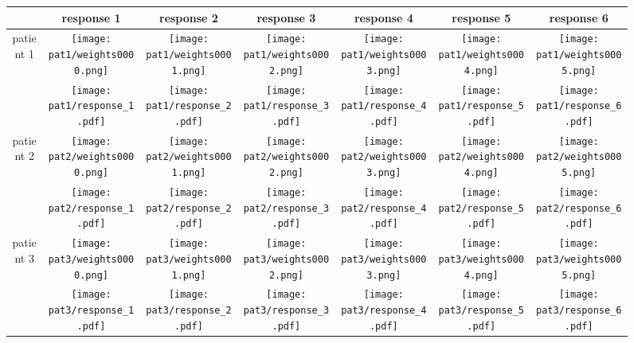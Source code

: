 \documentclass{article}
\begin{document}
\begin{figure}[htbp]
\begin{tabular}{*{7}{c}}
\toprule
& response 1 & response 2 & response 3 & response 4 & response 5 & response 6 \\
\midrule

\multirow{2}{*}{patient 1} & 
\texttt{[image: pat1/weights0000.png]} &
\texttt{[image: pat1/weights0001.png]} &
\texttt{[image: pat1/weights0002.png]} &
\texttt{[image: pat1/weights0003.png]} &
\texttt{[image: pat1/weights0004.png]} &
\texttt{[image: pat1/weights0005.png]} \\
& 
\texttt{[image: pat1/response\_1.pdf]} &
\texttt{[image: pat1/response\_2.pdf]} &
\texttt{[image: pat1/response\_3.pdf]} &
\texttt{[image: pat1/response\_4.pdf]} &
\texttt{[image: pat1/response\_5.pdf]} &
\texttt{[image: pat1/response\_6.pdf]} \\


\multirow{2}{*}{patient 2} & 
\texttt{[image: pat2/weights0000.png]} &
\texttt{[image: pat2/weights0001.png]} &
\texttt{[image: pat2/weights0002.png]} &
\texttt{[image: pat2/weights0003.png]} &
\texttt{[image: pat2/weights0004.png]} &
\texttt{[image: pat2/weights0005.png]} \\
& 
\texttt{[image: pat2/response\_1.pdf]} &
\texttt{[image: pat2/response\_2.pdf]} &
\texttt{[image: pat2/response\_3.pdf]} &
\texttt{[image: pat2/response\_4.pdf]} &
\texttt{[image: pat2/response\_5.pdf]} &
\texttt{[image: pat2/response\_6.pdf]} \\


\multirow{2}{*}{patient 3} & 
\texttt{[image: pat3/weights0000.png]} &
\texttt{[image: pat3/weights0001.png]} &
\texttt{[image: pat3/weights0002.png]} &
\texttt{[image: pat3/weights0003.png]} &
\texttt{[image: pat3/weights0004.png]} &
\texttt{[image: pat3/weights0005.png]} \\
& 
\texttt{[image: pat3/response\_1.pdf]} &
\texttt{[image: pat3/response\_2.pdf]} &
\texttt{[image: pat3/response\_3.pdf]} &
\texttt{[image: pat3/response\_4.pdf]} &
\texttt{[image: pat3/response\_5.pdf]} &
\texttt{[image: pat3/response\_6.pdf]} \\


\end{tabular}
\end{figure}
\end{document}
